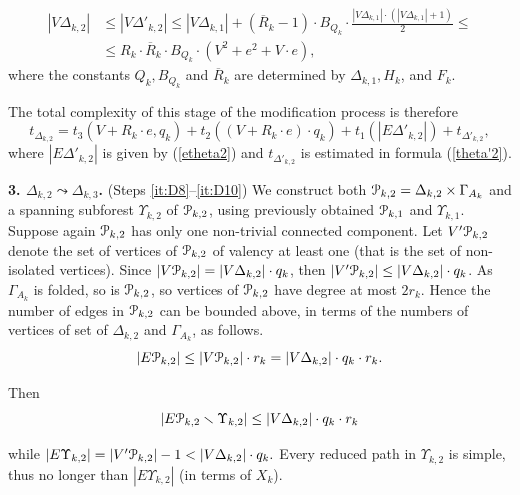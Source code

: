 \documentclass[a4paper,12pt]{article}
\newcommand{\G}{\Gamma }
\newcommand{\D}{\Delta }
\newcommand{\U}{\Upsilon }
\newcommand{\cP}{{\cal{P}}}
\numberwithin{equation}{section}
\numberwithin{figure}{section}
\begin{document}
\begin{equation}\label{vtheta2}
\begin{split}
|V\D_{k,2}| &\le |V \D'_{k,2}| \le |V\D_{k,1}|+(\overline{R}_k-1)\cdot B_{Q_k}
\cdot \frac{|V\D_{k,1}|\cdot(|V\D_{k,1}|+1)}{2}\le\\ &\le R_k \cdot
\overline{R}_k \cdot B_{Q_k}\cdot (V^2 + e^2+V\cdot e),
\end{split}
\end{equation}
where the constants $Q_k, B_{Q_k}$ and  $\overline{R}_k$ are determined  by $\D_{k,1},
H_k$, and $F_k$.


The total complexity of this stage of the modification process is
therefore
\begin{equation}\label{theta2}
t_{\D_{k,2}} = t_3(V + R_k \cdot e, q_k) + t_2((V + R_k \cdot e) \cdot
q_k)+ t_1(|E\D'_{k,2}|) + t_{\D'_{k,2}},
\end{equation}
where $|E\D'_{k,2}|$ is given by (\ref{etheta2}) and $t_{\D'_{k,2}}$ is
estimated in formula (\ref{theta'2}).


{\bf 3. $\D_{k,2} \leadsto \D_{k,3}$.} (Steps \ref{it:D8}--\ref{it:D10}) We construct both $\cP_{k,2}=\D_{k,2}\times \G_{A_k}$ and a spanning
subforest $\U_{k,2}$ of $\cP_{k,2}$, using previously obtained $\cP_{k,1}$ and $\U_{k,1}$. Suppose again
$\cP_{k,2}$ has only one non-trivial connected component.
 Let $V'\cP_{k,2}$ denote the set of vertices of $\cP_{k,2}$ of valency at least one
(that is the set of non-isolated vertices). Since $|V\cP_{k,2}|=|V\D_{k,2}|\cdot q_k$, then $|V'\cP_{k,2}|
\le |V\D_{k,2}|\cdot q_k$. As $\G_{A_k}$ is folded, so is $\cP_{k,2}$, so
vertices of $\cP_{k,2}$ have degree at most $2r_k$. Hence the number of
edges in $\cP_{k,2}$ can be bounded above, in terms of the numbers of
vertices of set of $\D_{k,2}$ and $\G_{A_k}$, as follows.
\[ |E\cP_{k,2}| \le |V\cP_{k,2}|\cdot r_k =|V\D_{k,2}|\cdot q_k \cdot r_k.\]

Then
\[|E\cP_{k,2}\smallsetminus \U_{k,2}| \le |V\D_{k,2}|\cdot q_k \cdot r_k\]

while $|E \U_{k,2}| = |V'\cP_{k,2}| - 1 < |V\D_{k,2}|\cdot q_k.$ Every reduced
path in $\U_{k,2}$ is simple, thus no longer than $|E\U_{k,2}|$ (in terms
of $X_k$).
\end{document}
